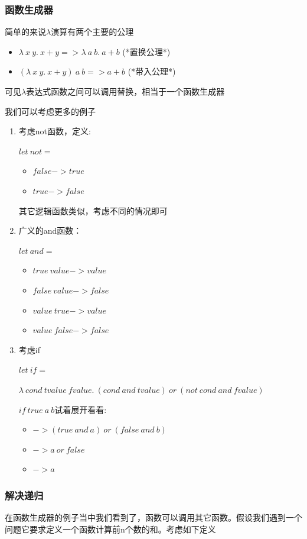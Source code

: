 \documentclass{article}
\begin{document}
		\subsubsection{函数生成器}
		简单的来说$\lambda$演算有两个主要的公理
		\begin{itemize}
		\item $\lambda\ x\ y.\ x+y => \lambda\ a\ b.\ a+b$ (*置换公理*)
		\item $(\lambda\ x\ y.\ x+y)\ a\ b=>a+b$	(*带入公理*)
		\end{itemize}
	
		可见$\lambda$表达式函数之间可以调用替换，相当于一个函数生成器
		
		我们可以考虑更多的例子
		\begin{enumerate}
		\item 
			考虑not函数，定义:
			
			$let\ not = $
			\begin{itemize}
				\item  $false -> true$
				\item  $true -> false$
			\end{itemize}
			
			其它逻辑函数类似，考虑不同的情况即可
		\item
			广义的and函数：
			
			$let\ and =$ 
			\begin{itemize}
				\item $true\ value -> value$
				\item $false\ value -> false$
				\item $value\ true -> value$
				\item $value\ false -> false$
			\end{itemize}
		
		\item
			考虑if
			
			$let\ if =$ 
			
			$\lambda\ cond\ tvalue\ fvalue.\ (cond\ and\ tvalue)\ or\ (not\ cond\ and\ fvalue)$
			
			$if\ true\ a\ b$试着展开看看:
			\begin{itemize}
				\item  $-> (true\ and\ a)\ or\ (false\ and\ b)$
				\item  $-> a\ or\ false$
				\item  $-> a$
			\end{itemize}
		\end{enumerate}
	
		\subsubsection{解决递归}
		在函数生成器的例子当中我们看到了，函数可以调用其它函数。假设我们遇到一个问题它要求定义一个函数计算前n个数的和。考虑如下定义
		
\end{document}
